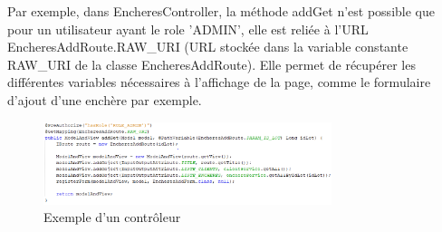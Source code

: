 		\noindent
		Par exemple, dans EncheresController, la méthode addGet n'est possible que pour un utilisateur ayant le role 'ADMIN', elle est reliée à l'URL EncheresAddRoute.RAW\_URI (URL stockée dans la variable constante RAW\_URI de la classe EncheresAddRoute). Elle permet de récupérer les différentes variables nécessaires à l'affichage de la page, comme le formulaire d'ajout d'une enchère par exemple.

		\begin{figure}[H]
			\centering\includegraphics[width=0.75\textwidth, keepaspectratio]{res/enchereController.png}
			\caption{Exemple d'un contrôleur}
		\end{figure}
